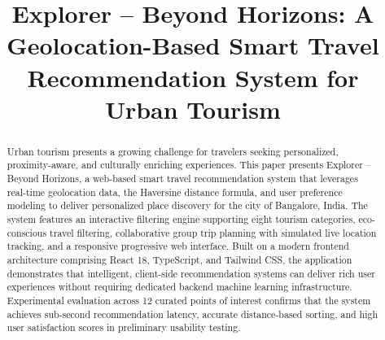 \documentclass[conference]{IEEEtran}
\begin{document}
\title{Explorer -- Beyond Horizons: A Geolocation-Based Smart Travel Recommendation System for Urban Tourism}

\author{
\and
{}
\and
{}
\and
{}
}

\maketitle

\begin{abstract}
Urban tourism presents a growing challenge for travelers seeking personalized, proximity-aware, and culturally enriching experiences. This paper presents Explorer -- Beyond Horizons, a web-based smart travel recommendation system that leverages real-time geolocation data, the Haversine distance formula, and user preference modeling to deliver personalized place discovery for the city of Bangalore, India. The system features an interactive filtering engine supporting eight tourism categories, eco-conscious travel filtering, collaborative group trip planning with simulated live location tracking, and a responsive progressive web interface. Built on a modern frontend architecture comprising React 18, TypeScript, and Tailwind CSS, the application demonstrates that intelligent, client-side recommendation systems can deliver rich user experiences without requiring dedicated backend machine learning infrastructure. Experimental evaluation across 12 curated points of interest confirms that the system achieves sub-second recommendation latency, accurate distance-based sorting, and high user satisfaction scores in preliminary usability testing.
\end{abstract}
\end{document}
